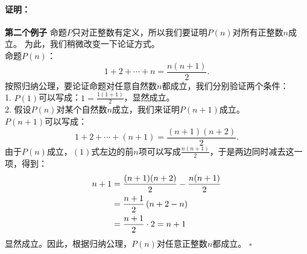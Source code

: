 \documentclass[12pt,UTF8]{ctexbook}
\newenvironment{proof2}{\paragraph{\textbf{证明：}}}{\hfill$\square$}
\begin{document}
\begin{proof2}{\textbf{第二个例子 }}
    命题$P$只对正整数有定义，所以我们要证明$P(n)$对所有正整数$n$成立。
    为此，我们稍微改变一下论证方式。\\
    命题$P(n)$：
    $$ 1 + 2 + \cdots + n = \frac{n(n+1)}{2}. $$
    按照归纳公理，要论证命题对任意自然数$n$都成立，我们分别验证两个条件：\\
    1. $P(1)$可以写成：$1 = \frac{1(1+1)}{2}$，显然成立。\\
    2. 假设$P(n)$对某个自然数$n$成立，我们来证明$P(n+1)$成立。\\
    $P(n+1)$可以写成：
    $$ 1 + 2 + \cdots + (n+1) = \frac{(n+1)(n+2)}{2}.  $$
    由于$P(n)$成立，$(1)$式左边的前$n$项可以写成$\frac{n(n+1)}{2}$，于是两边同时减去这一项，得到：
    \begin{align}
        n+1 &= \frac{(n+1)(n+2)}{2} - \frac{n(n+1)}{2} \notag \\
        &= \frac{n+1}{2}\left(n+2 - n\right) \notag \\
        &= \frac{n+1}{2} \cdot 2 = n+1 \notag
    \end{align}
    显然成立。因此，根据归纳公理，$P(n)$对任意正整数$n$都成立。    
\end{proof2}
\end{document}
